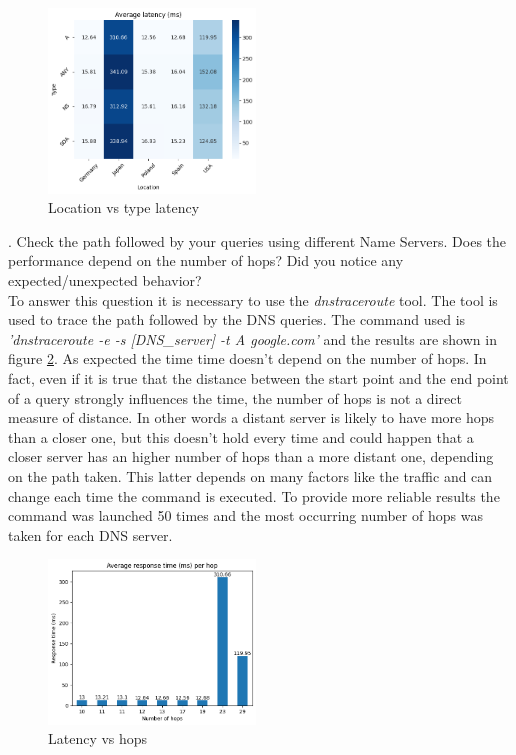 \documentclass[a4paper,10pt]{article}
\begin{document}
\begin{multicols}{2}
        \begin{figure}[H]
                \centering
                \includegraphics[width=0.49\textwidth]{location_type_latency.png}
                \caption{\small Location vs type latency }
                \label{fig:location_type_latency}
        \end{figure}
. Check the path followed by your queries using different Name Servers. Does the performance depend on the number of hops? Did you notice any expected/unexpected behavior?\\
To answer this question it is necessary to use the \textit{dnstraceroute} tool. The tool is used to trace the path followed by the DNS queries. The command used is \textit{'dnstraceroute -e -s [DNS\_server] -t A google.com'}
and the results are shown in figure \ref{fig:time_hops}. As expected the time time doesn't depend on the number of hops. In fact, even if it is true that the distance between the start point and the 
end point of a query strongly influences the time, the number of hops is not a direct measure of distance. In other words a distant server is likely to have more hops than a closer one, but
this doesn't hold every time and could happen that a closer server has an higher number of hops than a more distant one, depending on the path taken. 
This latter depends on many factors like the traffic and can change each time the command is executed. To provide more reliable results the command was launched 50 times 
and the most occurring number of hops was taken for each DNS server. \\

        \begin{figure}[H]
                \centering
                \includegraphics[width=0.49\textwidth]{time_num_hops.png}
                \caption{\small Latency vs hops}
                \label{fig:time_hops}
        \end{figure}
\noindent




\end{multicols}
\end{document}
